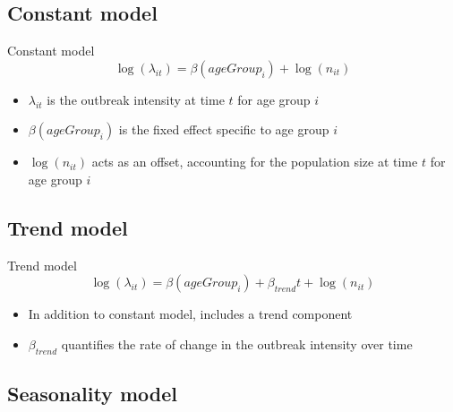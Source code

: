 \documentclass[aspectratio=169]{beamer}
\begin{document}
\hypertarget{constant-model}{%
\subsection{Constant model}\label{constant-model}}

\begin{frame}{Constant model}
\begin{equation}\label{eq:Agegroup}
  \log(\lambda_{it}) = \beta(ageGroup_{i}) + \log(n_{it})
\end{equation}

\begin{itemize}
  \item $\lambda_{it}$ is the outbreak intensity at time $t$ for age group $i$
  \item $\beta(ageGroup_{i})$ is the fixed effect specific to age group $i$
  \item $\log(n_{it})$ acts as an offset, accounting for the population size at time $t$ for age group $i$
\end{itemize}
\end{frame}

\hypertarget{trend-model}{%
\subsection{Trend model}\label{trend-model}}

\begin{frame}{Trend model}
\begin{equation}
  \log(\lambda_{it})=\beta(ageGroup_{i}) + \beta_{trend} t + \log(n_{it})
\end{equation}

\begin{itemize}
  \item In addition to constant model, includes a trend component
  \item $\beta_{trend}$ quantifies the rate of change in the outbreak intensity over time
\end{itemize}
\end{frame}

\hypertarget{seasonality-model}{%
\subsection{Seasonality model}\label{seasonality-model}}
\end{document}
